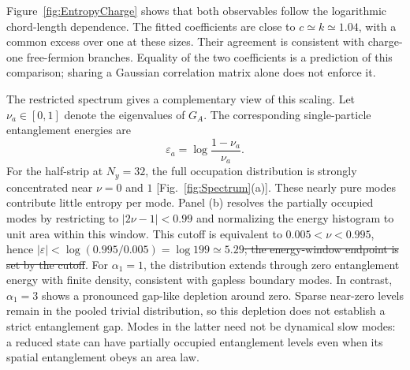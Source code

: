 \documentclass[aps,prb,10pt,twocolumn,superscriptaddress,longbibliography,floatfix]{revtex4-2}
\newcommand{\claudeadd}[1]{{\color{orange}#1}}
\newcommand{\claudedel}[1]{{\color{orange}\sout{#1}}}
\begin{document}
{\color{blue}
Figure~\ref{fig:EntropyCharge} shows that both observables follow the logarithmic chord-length dependence. The fitted coefficients are close to $c\simeq k\simeq1.04$, with a common excess over one at these sizes. Their agreement is consistent with charge-one free-fermion branches. Equality of the two coefficients is a prediction of this comparison; sharing a Gaussian correlation matrix alone does not enforce it.

The restricted spectrum gives a complementary view of this scaling. \claudeadd{Let $\nu_a\in[0,1]$ denote the eigenvalues of $G_A$.} The corresponding single-particle entanglement energies are
\begin{equation}
 \varepsilon_a=\log\frac{1-\nu_a}{\nu_a}.
 \label{eq:EntanglementEnergies}
\end{equation}
For the half-strip at $N_y=32$, the full occupation distribution is strongly concentrated near $\nu=0$ and $1$ [Fig.~\ref{fig:Spectrum}(a)]. These nearly pure modes contribute little entropy per mode. Panel (b) resolves the partially occupied modes by restricting to $|2\nu-1|<0.99$ and normalizing the energy histogram to unit area within this window. This cutoff is equivalent to $0.005<\nu<0.995$, hence $|\varepsilon|<\log(0.995/0.005)=\log199\simeq5.29$\claudedel{; the energy-window endpoint is set by the cutoff}. For $\alpha_1=1$, the distribution extends through zero entanglement energy with finite density, consistent with gapless boundary modes. In contrast, $\alpha_1=3$ shows a pronounced gap-like depletion around zero. Sparse near-zero levels remain in the pooled trivial distribution, so this depletion does not establish a strict entanglement gap. Modes in the latter need not be dynamical slow modes: a reduced state can have partially occupied entanglement levels even when its spatial entanglement obeys an area law.

}
\end{document}
